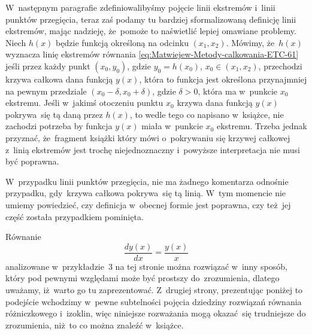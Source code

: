 \documentclass[a4paper,11pt]{article}
\numberwithin{equation}{section}
\begin{document}
W~następnym paragrafie zdefiniowalibyśmy pojęcie linii ekstremów i~linii
punktów przegięcia, teraz zaś podamy tu bardziej sformalizowaną definicję
linii ekstremów, mając nadzieję, że~pomoże to naświetlić lepiej omawiane
problemy. Niech $h( x )$ będzie funkcją określoną na odcinku
$( x_{ 1 }, x_{ 2 } )$.
Mówimy, że~$h( x )$ wyznacza linię ekstremów równania
\eqref{eq:Matwiejew-Metody-calkowania-ETC-61} jeśli przez każdy
punkt $( x_{ 0 }, y_{ 0 } )$, gdzie $y_{ 0 } = h( x_{ 0 } )$,
$x_{ 0 } \in ( x_{ 1 }, x_{ 2 } )$, przechodzi
krzywa całkowa dana funkcją $y( x )$, która to funkcja jest określona
przynajmniej na pewnym przedziale $( x_{ 0 } - \delta, x_{ 0 } + \delta )$, gdzie
$\delta > 0$, która ma w~punkcie $x_{ 0 }$ ekstremu. Jeśli w~jakimś otoczeniu
punktu $x_{ 0 }$ krzywa dana funkcją $y( x )$ pokrywa~się tą daną przez
$h( x )$, to wedle tego co napisano w~książce, nie zachodzi potrzeba by
funkcja $y( x )$ miała w~punkcie $x_{ 0 }$ ekstremu. Trzeba jednak
przyznać, że~fragment książki który mówi o~pokrywaniu się krzywej całkowej
z~linią ekstremów jest trochę niejednoznaczny i~powyższe interpretacja nie
musi być poprawna.

W~przypadku linii punktów przegięcia, nie ma żadnego komentarza odnośnie
przypadku, gdy~krzywa całkowa pokrywa~się tą linią. W~tym momencie nie
umiemy powiedzieć, czy definicja w~obecnej formie jest poprawna, czy
też~jej część została przypadkiem pominięta.

\VerSpaceFour





\noindent
{} Równanie
\begin{equation}
  \label{eq:Uwagi-do-konkrentych-stron-44}
  \frac{ d y( x ) }{ dx } =
  \frac{ y( x ) }{ x }
\end{equation}
analizowane w~przykładzie~3 na tej stronie można rozwiązać w~inny sposób,
który pod pewnymi względami może być prostszy do~zrozumienia, dlatego
uważamy, iż~warto go tu zaprezentować. Z~drugiej
strony, prezentując poniżej to podejście wchodzimy w~pewne subtelności
pojęcia dziedziny rozwiązań równania różniczkowego i~izoklin, więc niniejsze
rozważania mogą okazać~się trudniejsze do zrozumienia, niż~to co można
znaleźć w~książce.
\end{document}
